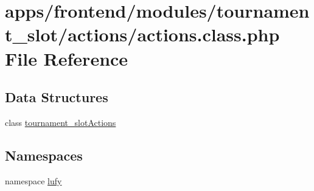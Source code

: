 \hypertarget{frontend_2modules_2tournament__slot_2actions_2actions_8class_8php}{\section{apps/frontend/modules/tournament\-\_\-slot/actions/actions.class.\-php File Reference}
\label{frontend_2modules_2tournament__slot_2actions_2actions_8class_8php}
}
\subsection*{Data Structures}
\begin{DoxyCompactItemize}
\item 
class \hyperlink{classtournament__slot_actions}{tournament\-\_\-slot\-Actions}
\end{DoxyCompactItemize}
\subsection*{Namespaces}
\begin{DoxyCompactItemize}
\item 
namespace \hyperlink{namespacelufy}{lufy}
\end{DoxyCompactItemize}
